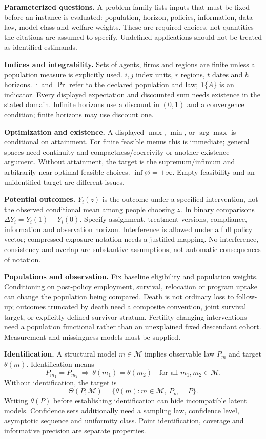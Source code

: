 \documentclass[11pt,a4paper]{article}
\begin{document}
\textbf{Parameterized questions.} A problem family lists inputs that must be fixed before an instance is evaluated: population, horizon, policies, information, data law, model class and welfare weights. These are required choices, not quantities the citations are assumed to specify. Undefined applications should not be treated as identified estimands.

\textbf{Indices and integrability.} Sets of agents, firms and regions are finite unless a population measure is explicitly used. \(i,j\) index units, \(r\) regions, \(t\) dates and \(h\) horizons. \(\mathbb E\) and \(\Pr\) refer to the declared population and law; \(\mathbf1\{A\}\) is an indicator. Every displayed expectation and discounted sum needs existence in the stated domain. Infinite horizons use a discount in \((0,1)\) and a convergence condition; finite horizons may use discount one.

\textbf{Optimization and existence.} A displayed \(\max\), \(\min\), or \(\arg\max\) is conditional on attainment. For finite feasible menus this is immediate; general spaces need continuity and compactness/coercivity or another existence argument. Without attainment, the target is the supremum/infimum and arbitrarily near-optimal feasible choices. \(\inf\varnothing=+\infty\). Empty feasibility and an unidentified target are different issues.

\textbf{Potential outcomes.} \(Y_i(z)\) is the outcome under a specified intervention, not the observed conditional mean among people choosing \(z\). In binary comparisons \(\Delta Y_i=Y_i(1)-Y_i(0)\). Specify assignment, treatment versions, compliance, information and observation horizon. Interference is allowed under a full policy vector; compressed exposure notation needs a justified mapping. No interference, consistency and overlap are substantive assumptions, not automatic consequences of notation.

\textbf{Populations and observation.} Fix baseline eligibility and population weights. Conditioning on post-policy employment, survival, relocation or program uptake can change the population being compared. Death is not ordinary loss to follow-up; outcomes truncated by death need a composite convention, joint survival target, or explicitly defined survivor stratum. Fertility-changing interventions need a population functional rather than an unexplained fixed descendant cohort. Measurement and missingness models must be supplied.

\textbf{Identification.} A structural model \(m\in\mathcal M\) implies observable law \(P_m\) and target \(\theta(m)\). Identification means
\[
 P_{m_1}=P_{m_2}\ \Longrightarrow\ \theta(m_1)=\theta(m_2)
 \quad\text{for all }m_1,m_2\in\mathcal M .
\]
Without identification, the target is
\[
 \Theta(P;\mathcal M)=\{\theta(m):m\in\mathcal M,\ P_m=P\}.
\]
Writing \(\theta(P)\) before establishing identification can hide incompatible latent models. Confidence sets additionally need a sampling law, confidence level, asymptotic sequence and uniformity class. Point identification, coverage and informative precision are separate properties.
\end{document}
